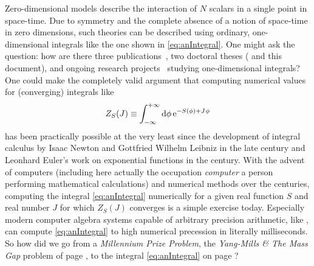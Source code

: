 Zero-dimensional \ON{} models describe the interaction of $N$ scalars in a single point in space-time.
Due to \ON{} symmetry and the complete absence of a notion of space-time in zero dimensions, such theories can be described using ordinary, one-dimensional integrals like the one shown in \cref{eq:anIntegral}.
One might ask the question: how are there three publications~\cite{zerod1,zerod2,zerod3}, two doctoral theses ( and this document), and ongoing research projects~\cite{Steil:partIV,Koenigstein:fixedPoint} studying one-dimensional integrals?
One could make the completely valid argument that computing numerical values for (converging) integrals like 
\begin{align}
	Z_S(J)\equiv \int_{-\infty}^{+\infty} \dif \phi \, \eu^{-S(\phi)+J\vts\phi}
	\label{eq:anIntegral}
\end{align}
has been practically possible at the very least since the development of integral calculus by Isaac Newton and Gottfried Wilhelm Leibniz in the late  century and 
Leonhard Euler's work on exponential functions in the  century. 
With the advent of computers (including here actually the occupation \textit{computer} \dash{} a person performing mathematical calculations) and numerical methods over the centuries,
computing the integral \eqref{eq:anIntegral} numerically for a given real function $S$ and real number $J$ \dash{} for which $Z_S(J)$ converges \dash{} is a simple exercise today.
Especially modern computer algebra systems capable of arbitrary precision arithmetic, like \WAMwR{}, can compute \cref{eq:anIntegral} to high numerical precession in literally milliseconds.
So how did we go from a \textit{Millennium Prize Problem}, \viz{} the \textit{Yang-Mills \& The Mass Gap} problem of page \pageref{YMmillennium}, to the integral \eqref{eq:anIntegral} on page \pageref{eq:anIntegral}?\bigskip

